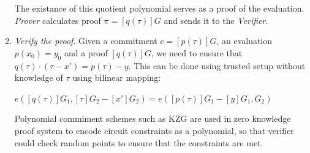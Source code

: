 \documentclass[../lecture-notes.tex]{subfiles}
\begin{document}
\begin{enumerate}
    The existance of this quotient polynomial serves
    as a proof of the evaluation. \textit{Prover} calculates proof $\pi = [q(\tau)]G$ and sends it to the \textit{Verifier}.

    \item \textit{Verify the proof}. Given a commitment $c = [p(\tau)]G$, an evaluation $p(x_0) = y_0$ and a proof $[q(\tau)]G$, we need to
    ensure that $q(\tau) \cdot (\tau - x') = p(\tau) - y$. This can be done using trusted setup without knowledge of $\tau$ using bilinear mapping:

    \begin{center}
        $e([q(\tau)]G_1, [\tau]G_2 - [x']G_2) = e([p(\tau)]G_1 - [y]G_1, G_2)$
    \end{center}
    
    Polynomial commiment schemes such as KZG are used in zero knowledge proof system to encode circuit constraints as a polynomial, 
    so that verifier could check random points to ensure that the constraints are met.

\end{enumerate}
\end{document}
